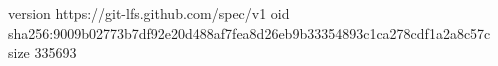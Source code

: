 version https://git-lfs.github.com/spec/v1
oid sha256:9009b02773b7df92e20d488af7fea8d26eb9b33354893c1ca278cdf1a2a8c57c
size 335693
